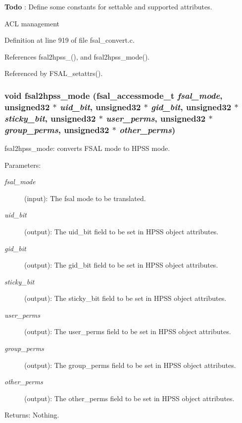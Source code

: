\begin{Desc}
\item[{\bf Todo}]: Define some constants for settable and supported attributes. 

ACL management\end{Desc}


Definition at line 919 of file fsal\_\-convert.c.

References fsal2hpss\_(), and fsal2hpss\_\-mode().

Referenced by FSAL\_\-setattrs().
\subsubsection{\setlength{\rightskip}{0pt plus 5cm}void fsal2hpss\_\-mode (fsal\_\-accessmode\_\-t {\em fsal\_\-mode}, unsigned32 $\ast$ {\em uid\_\-bit}, unsigned32 $\ast$ {\em gid\_\-bit}, unsigned32 $\ast$ {\em sticky\_\-bit}, unsigned32 $\ast$ {\em user\_\-perms}, unsigned32 $\ast$ {\em group\_\-perms}, unsigned32 $\ast$ {\em other\_\-perms})}\label{fsal__convert_8c_a13}


fsal2hpss\_\-mode: converts FSAL mode to HPSS mode.

\begin{Desc}
\item[Parameters:]
\begin{description}
\item[{\em fsal\_\-mode}](input): The fsal mode to be translated. \item[{\em uid\_\-bit}](output): The uid\_\-bit field to be set in HPSS object attributes. \item[{\em gid\_\-bit}](output): The gid\_\-bit field to be set in HPSS object attributes. \item[{\em sticky\_\-bit}](output): The sticky\_\-bit field to be set in HPSS object attributes. \item[{\em user\_\-perms}](output): The user\_\-perms field to be set in HPSS object attributes. \item[{\em group\_\-perms}](output): The group\_\-perms field to be set in HPSS object attributes. \item[{\em other\_\-perms}](output): The other\_\-perms field to be set in HPSS object attributes.\end{description}
\end{Desc}
\begin{Desc}
\item[Returns:]Nothing. \end{Desc}


